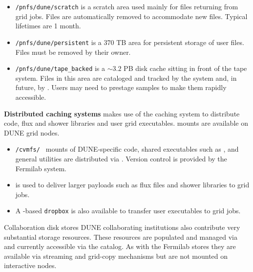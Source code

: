 \documentclass[../main-v1.tex]{subfiles}
\begin{document}
\begin{description}
\begin{itemize}
    \item {\tt /pnfs/dune/scratch}  is a scratch area used mainly for files returning from grid jobs.  Files are automatically removed to accommodate new files. Typical lifetimes are 1 month. 
     \item {\tt /pnfs/dune/persistent} is a 370 TB area for persistent storage of user files.  Files must be removed by their owner. 
      \item {\tt /pnfs/dune/tape\_backed} is a $\sim 3.2$ PB disk cache sitting in front of the  tape system. Files in this area are cataloged and tracked by the  system and, in future, by . Users may need to prestage samples to make them rapidly accessible. 
\end{itemize}
\item{\bf Distributed caching systems}
 makes use of the  caching system to distribute code, flux and shower libraries and user grid executables.  mounts are available on DUNE grid nodes. 



\begin{itemize}
    \item {\tt /cvmfs/ } mounts of DUNE-specific code,  shared executables such as , and general utilities are distributed via . Version control is provided by the Fermilab  system. 
    
    \item {} is used to deliver larger payloads such as flux files and shower libraries to grid jobs.
    
    \item A -based  {\tt dropbox} is also available to transfer user executables to grid jobs. 
    
    
\end{itemize}

\item{Collaboration disk stores}
DUNE collaborating institutions also contribute very substantial storage resources. These resources are populated and managed via  and currently accessible via the  catalog. As with the Fermilab  stores they are available via streaming and grid-copy mechanisms but are not mounted on interactive nodes. 
 

\end{description}
\end{document}
